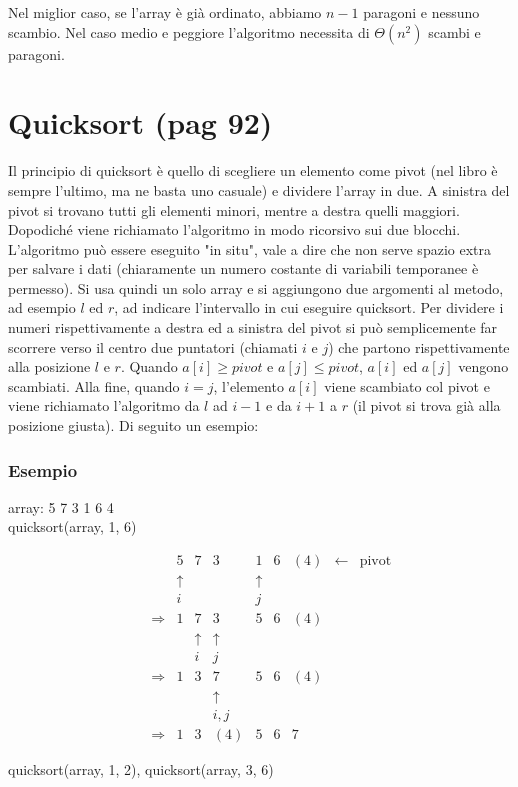 \documentclass[a4paper]{book}
\begin{document}
Nel miglior caso, se l'array è già ordinato, abbiamo $n-1$ paragoni e nessuno scambio. Nel caso medio e peggiore l'algoritmo necessita di $\Theta (n^2)$ scambi e paragoni.

\section{Quicksort (pag 92)}
Il principio di quicksort è quello di scegliere un elemento come pivot (nel libro è sempre l'ultimo, ma ne basta uno casuale) e dividere l'array in due. A sinistra del pivot si trovano tutti gli elementi minori, mentre a destra quelli maggiori. Dopodiché viene richiamato l'algoritmo in modo ricorsivo sui due blocchi. L'algoritmo può essere eseguito "in situ", vale a dire che non serve spazio extra per salvare i dati (chiaramente un numero costante di variabili temporanee è permesso). Si usa quindi un solo array e si aggiungono due argomenti al metodo, ad esempio $l$ ed $r$, ad indicare l'intervallo in cui eseguire quicksort. Per dividere i numeri rispettivamente a destra ed a sinistra del pivot si può semplicemente far scorrere verso il centro due puntatori (chiamati $i$ e $j$) che partono rispettivamente alla posizione $l$ e $r$. Quando $a[i] \geq pivot$ e $a[j] \leq pivot$, $a[i]$ ed $a[j]$ vengono scambiati. Alla fine, quando $i=j$, l'elemento $a[i]$ viene scambiato col pivot e viene richiamato l'algoritmo da $l$ ad $i-1$ e da $i+1$ a $r$ (il pivot si trova già alla posizione giusta). Di seguito un esempio:
\subsubsection*{Esempio}
\begin{center}
array: 5 7 3 1 6 4\\
quicksort(array, 1, 6)
\end{center}
\[\begin{array}{*{20}{c}}
{}&{}&{}&5&7&3&1&6&{(4)}& \leftarrow &{{\text{pivot}}}\\
{}&{}&{}& \uparrow &{}&{}& \uparrow &{}&{}&{}&{}\\
{}&{}&{}&i&{}&{}&j&{}&{}&{}&{}\\
{}&{}& \Rightarrow &1&7&3&5&6&{(4)}&{}&{}\\
{}&{}&{}&{}& \uparrow & \uparrow &{}&{}&{}&{}&{}\\
{}&{}&{}&{}&i&j&{}&{}&{}&{}&{}\\
{}&{}& \Rightarrow &1&3&7&5&6&{(4)}&{}&{}\\
{}&{}&{}&{}&{}& \uparrow &{}&{}&{}&{}&{}\\
{}&{}&{}&{}&{}&{i,j}&{}&{}&{}&{}&{}\\
{}&{}& \Rightarrow &1&3&{(4)}&5&6&7&{}&{}
\end{array}\]
\begin{center}quicksort(array, 1, 2), quicksort(array, 3, 6)\end{center}
\end{document}
